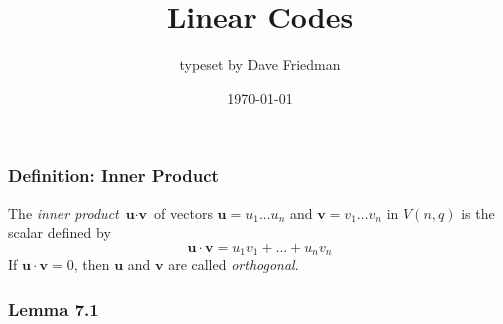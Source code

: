 \documentclass{article}
\title{Linear Codes}
\date{\today{}}
\author{typeset by Dave Friedman}
\begin{document}
\maketitle{}
\newpage{}
\tableofcontents{}
\setcounter{secnumdepth}{0}
\newpage{}

%
% 
%

\subsubsection{Definition: Inner Product}
The \emph{inner product} $\textbf{u}\cdot\textbf{v}$ of vectors $\textbf{u}=u_1...u_n$ and $\textbf{v}=v_1...v_n$ in $V(n,q)$ is the scalar defined by \[\textbf{u}\cdot\textbf{v}=u_1v_1+...+u_nv_n\]
If $\textbf{u}\cdot\textbf{v}=0$, then $\boldsymbol{u}$ and $\boldsymbol{v}$ are called \emph{orthogonal}.
\subsubsection{Lemma 7.1}
\end{document}
